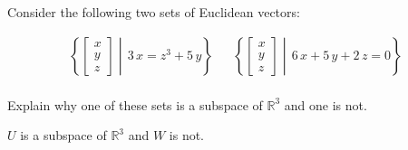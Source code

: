 
\begin{exerciseStatement}


Consider the following two sets of Euclidean vectors: 


\begin{align*}  \left\{ \left[\begin{array}{c}
x \\
y \\
z
\end{array}\right] \middle|\,3 \, x = z^{3} + 5 \, y\right\}  & &   \left\{ \left[\begin{array}{c}
x \\
y \\
z
\end{array}\right] \middle|\,6 \, x + 5 \, y + 2 \, z = 0\right\}  \\ \end{align*}
            

 Explain why one of these sets is a subspace of \(\mathbb{R}^ 3 \) and one is not. 


\end{exerciseStatement}
    
\begin{exerciseAnswer} 


\(U\) is a subspace of \(\mathbb{R}^ 3 \) and \(W\) is not.


\end{exerciseAnswer}
    
